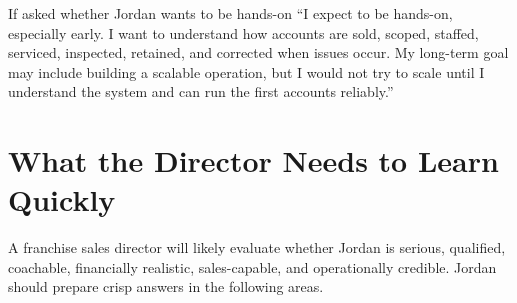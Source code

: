 \documentclass[11pt]{article}
\begin{document}
\begin{scriptbox}{If asked whether Jordan wants to be hands-on}
``I expect to be hands-on, especially early. I want to understand how accounts are sold, scoped, staffed, serviced, inspected, retained, and corrected when issues occur. My long-term goal may include building a scalable operation, but I would not try to scale until I understand the system and can run the first accounts reliably.''
\end{scriptbox}

\section{What the Director Needs to Learn Quickly}

A franchise sales director will likely evaluate whether Jordan is serious, qualified, coachable, financially realistic, sales-capable, and operationally credible. Jordan should prepare crisp answers in the following areas.
\end{document}
